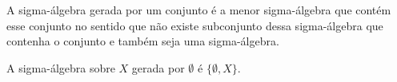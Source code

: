 	A sigma-álgebra gerada por um conjunto é a menor sigma-álgebra que contém esse conjunto no sentido que não existe subconjunto dessa sigma-álgebra que contenha o conjunto e também seja uma sigma-álgebra.

\begin{ex}
	A sigma-álgebra sobre $X$ gerada por $\emptyset$ é $\{\emptyset, X\}$.
\end{ex}




